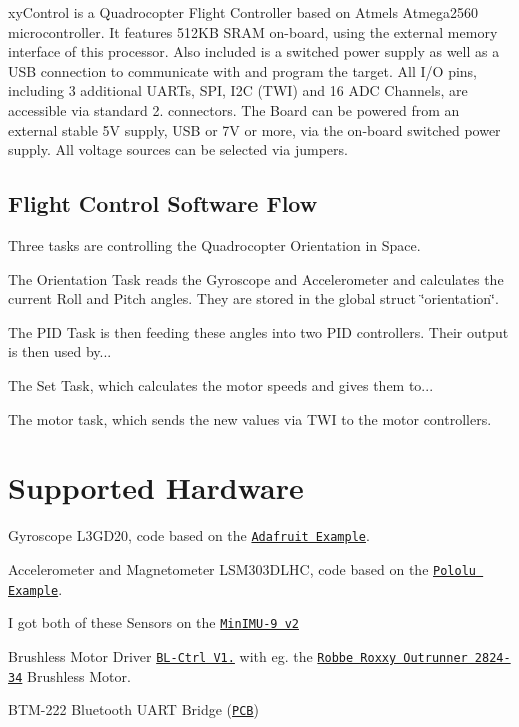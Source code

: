 

xy\-Control is a Quadrocopter Flight Controller based on Atmels Atmega2560 microcontroller. It features 512\-K\-B S\-R\-A\-M on-\/board, using the external memory interface of this processor. Also included is a switched power supply as well as a U\-S\-B connection to communicate with and program the target. All I/\-O pins, including 3 additional U\-A\-R\-Ts, S\-P\-I, I2\-C (T\-W\-I) and 16 A\-D\-C Channels, are accessible via standard 2.\-54mm connectors. The Board can be powered from an external stable 5\-V supply, U\-S\-B or 7\-V or more, via the on-\/board switched power supply. All voltage sources can be selected via jumpers.

\subsection*{Flight Control Software Flow}

Three tasks are controlling the Quadrocopter Orientation in Space.


\begin{DoxyItemize}
\item The Orientation Task reads the Gyroscope and Accelerometer and calculates the current Roll and Pitch angles. They are stored in the global struct \char`\"{}orientation\char`\"{}.
\item The P\-I\-D Task is then feeding these angles into two P\-I\-D controllers. Their output is then used by...
\item The Set Task, which calculates the motor speeds and gives them to...
\item The motor task, which sends the new values via T\-W\-I to the motor controllers.
\end{DoxyItemize}

\section*{Supported Hardware}


\begin{DoxyItemize}
\item Gyroscope L3\-G\-D20, code based on the \href{https://github.com/adafruit/Adafruit_L3GD20}{\tt Adafruit Example}.
\item Accelerometer and Magnetometer L\-S\-M303\-D\-L\-H\-C, code based on the \href{https://github.com/pololu/LSM303}{\tt Pololu Example}.
\item I got both of these Sensors on the \href{http://www.pololu.com/catalog/product/1268}{\tt Min\-I\-M\-U-\/9 v2}
\item Brushless Motor Driver \href{http://www.mikrokopter.de/ucwiki/en/BL-Ctrl_V1.2}{\tt B\-L-\/\-Ctrl V1.} with eg. the \href{http://www.conrad.de/ce/de/product/231867}{\tt Robbe Roxxy Outrunner 2824-\/34} Brushless Motor.
\item B\-T\-M-\/222 Bluetooth U\-A\-R\-T Bridge (\href{http://xythobuz.org/index.php?p=bt}{\tt P\-C\-B})
\end{DoxyItemize}

